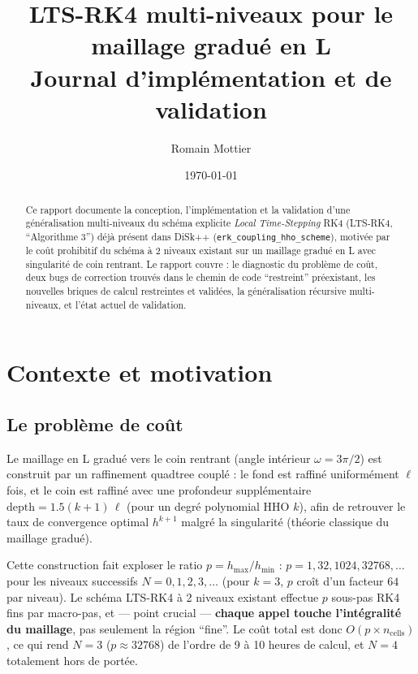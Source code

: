 \documentclass[11pt]{article}
\title{LTS-RK4 multi-niveaux pour le maillage gradué en L\\
\large Journal d'implémentation et de validation}
\author{Romain Mottier}
\date{\today}
\newcommand{\code}[1]{\texttt{#1}}
\begin{document}
\maketitle

\begin{abstract}
Ce rapport documente la conception, l'implémentation et la validation d'une
généralisation multi-niveaux du schéma explicite \emph{Local Time-Stepping}
RK4 (LTS-RK4, ``Algorithme 3'') déjà présent dans DiSk++
(\code{erk\_coupling\_hho\_scheme}), motivée par le coût prohibitif du
schéma à 2 niveaux existant sur un maillage gradué en L avec singularité de
coin rentrant. Le rapport couvre : le diagnostic du problème de coût, deux
bugs de correction trouvés dans le chemin de code ``restreint'' préexistant,
les nouvelles briques de calcul restreintes et validées, la généralisation
récursive multi-niveaux, et l'état actuel de validation.
\end{abstract}

\tableofcontents

\section{Contexte et motivation}

\subsection{Le problème de coût}

Le maillage en L gradué vers le coin rentrant (angle intérieur $\omega =
3\pi/2$) est construit par un raffinement quadtree couplé : le fond est
raffiné uniformément $\ell$ fois, et le coin est raffiné avec une
profondeur supplémentaire $\mathrm{depth} = 1.5(k+1)\,\ell$ (pour un degré
polynomial HHO $k$), afin de retrouver le taux de convergence optimal
$h^{k+1}$ malgré la singularité (théorie classique du maillage gradué).

Cette construction fait exploser le ratio $p = h_{\max}/h_{\min}$ :
$p = 1, 32, 1024, 32768,\dots$ pour les niveaux successifs $N=0,1,2,3,\dots$
(pour $k=3$, $p$ croît d'un facteur $64$ par niveau). Le schéma LTS-RK4 à 2
niveaux existant effectue $p$ sous-pas RK4 fins par macro-pas, et --- point
crucial --- \textbf{chaque appel touche l'intégralité du maillage}, pas
seulement la région ``fine''. Le coût total est donc $O(p \times
n_{\text{cells}})$, ce qui rend $N=3$ ($p\approx 32768$) de l'ordre de 9 à
10 heures de calcul, et $N=4$ totalement hors de portée.
\end{document}
